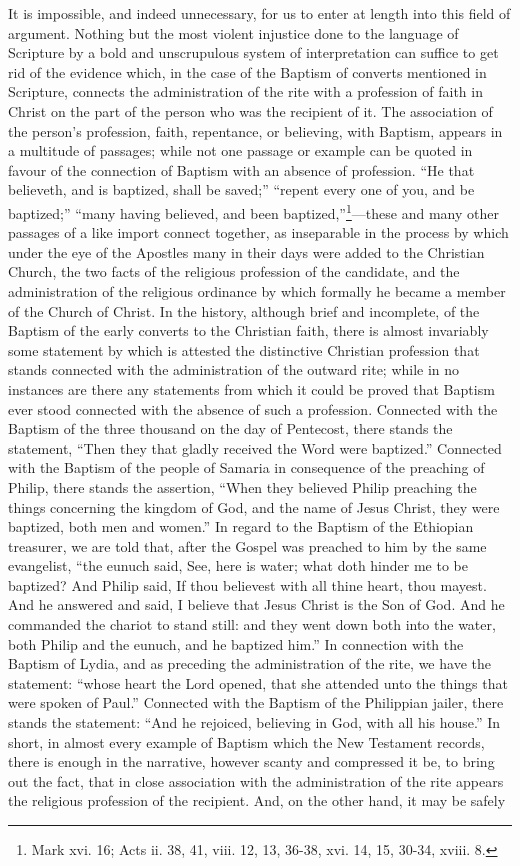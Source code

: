 \documentclass[]{book}
\begin{document}
It is impossible, and indeed unnecessary, for us to enter at length into this field of argument. Nothing but the most violent injustice done to the language of Scripture by a bold and unscrupulous system of interpretation can suffice to get rid of the evidence which, in the case of the Baptism of converts mentioned in Scripture, connects the administration of the rite with a profession of faith in Christ on the part of the person who was the recipient of it. The association of the person's profession, faith, repentance, or believing, with Baptism, appears in a multitude of passages; while not one passage or example can be quoted in favour of the connection of Baptism with an absence of profession. ``He that believeth, and is baptized, shall be saved;'' ``repent every one of you, and be baptized;'' ``many having believed, and been baptized,''\footnote{Mark xvi. 16; Acts ii. 38, 41, viii. 12, 13, 36-38, xvi. 14, 15, 30-34, xviii. 8.}---these and many other passages of a like import connect together, as inseparable in the process by which under the eye of the Apostles many in their days were added to the Christian Church, the two facts of the religious profession of the candidate, and the administration of the religious ordinance by which formally he became a member of the Church of Christ. In the history, although brief and incomplete, of the Baptism of the early converts to the Christian faith, there is almost invariably some statement by which is attested the distinctive Christian profession that stands connected with the administration of the outward rite; while in no instances are there any statements from which it could be proved that Baptism ever stood connected with the absence of such a profession. Connected with the Baptism of the three thousand on the day of Pentecost, there stands the statement, ``Then they that gladly received the Word were baptized.'' Connected with the Baptism of the people of Samaria in consequence of the preaching of Philip, there stands the assertion, ``When they believed Philip preaching the things concerning the kingdom of God, and the name of Jesus Christ, they were baptized, both men and women.'' In regard to the Baptism of the Ethiopian treasurer, we are told that, after the Gospel was preached to him by the same evangelist, ``the eunuch said, See, here is water; what doth hinder me to be baptized? And Philip said, If thou believest with all thine heart, thou mayest. And he answered and said, I believe that Jesus Christ is the Son of God. And he commanded the chariot to stand still: and they went down both into the water, both Philip and the eunuch, and he baptized him.'' In connection with the Baptism of Lydia, and as preceding the administration of the rite, we have the statement: ``whose heart the Lord opened, that she attended unto the things that were spoken of Paul.'' Connected with the Baptism of the Philippian jailer, there stands the statement: ``And he rejoiced, believing in God, with all his house.'' In short, in almost every example of Baptism which the New Testament records, there is enough in the narrative, however scanty and compressed it be, to bring out the fact, that in close association with the administration of the rite appears the religious profession of the recipient. And, on the other hand, it may be safely 
\end{document}
